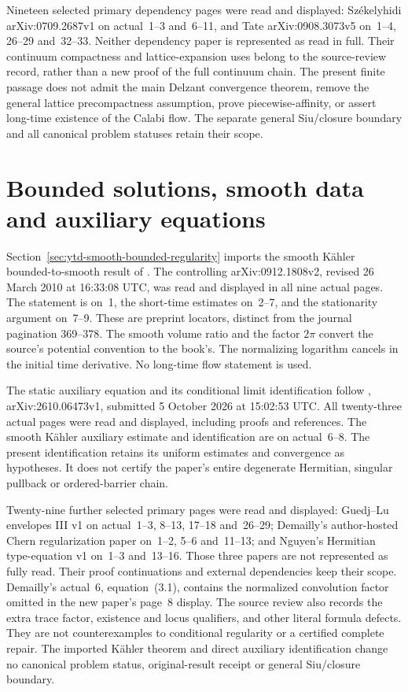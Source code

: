 Nineteen selected primary dependency pages were read and displayed:
Sz\'ekelyhidi arXiv:\allowbreak 0709.2687v1 on actual~1--3 and~6--11,
and Tate arXiv:\allowbreak 0908.3073v5 on~1--4, 26--29 and~32--33.
Neither dependency paper is represented as read in full. Their
continuum compactness and lattice-expansion uses belong to the
source-review record, rather than a new proof of the full continuum
chain. The present finite passage does not admit the main Delzant
convergence theorem, remove the general lattice precompactness
assumption, prove piecewise-affinity, or assert long-time existence
of the Calabi flow. The separate general Siu/closure boundary and
all canonical problem statuses retain their scope.

\section{Bounded solutions, smooth data and auxiliary equations}
\label{sec:provenance-smooth-bounded-regularity}

Section~\ref{sec:ytd-smooth-bounded-regularity} imports the smooth
K\"ahler bounded-to-smooth result of
\cite[Theorem~1.1]{SzekelyhidiTosatti11RegularityV2}.
The controlling arXiv:\allowbreak 0912.1808v2, revised 26 March
2010 at 16:33:08 UTC, was read and displayed in all nine actual
pages. The statement is on~1, the short-time estimates on~2--7,
and the stationarity argument on~7--9. These are preprint locators,
distinct from the journal pagination 369--378. The smooth volume
ratio and the factor $2\pi$ convert the source's potential convention
to the book's. The normalizing logarithm cancels in the initial
time derivative. No long-time flow statement is used.

The static auxiliary equation and its conditional limit identification
follow \cite{BadianeLuZeriahi26RegularityV1},
arXiv:\allowbreak 2610.06473v1, submitted 5 October 2026 at
15:02:53 UTC. All twenty-three actual pages were read and displayed,
including proofs and references. The smooth K\"ahler auxiliary
estimate and identification are on actual~6--8. The present
identification retains its uniform estimates and convergence as
hypotheses. It does not certify the paper's entire degenerate
Hermitian, singular pullback or ordered-barrier chain.

Twenty-nine further selected primary pages were read and displayed:
Guedj--Lu envelopes III v1 on actual~1--3, 8--13, 17--18 and~26--29;
Demailly's author-hosted Chern regularization paper on~1--2, 5--6
and~11--13; and Nguyen's Hermitian type-equation v1 on~1--3
and~13--16. Those three papers are not represented as fully read.
Their proof continuations and external dependencies keep their scope.
Demailly's actual~6, equation~(3.1), contains the normalized
convolution factor omitted in the new paper's page~8 display.
The source review also records the extra trace factor, existence
and locus qualifiers, and other literal formula defects. They are
not counterexamples to conditional regularity or a certified
complete repair. The imported K\"ahler theorem and direct auxiliary
identification change no canonical problem status, original-result
receipt or general Siu/closure boundary.

